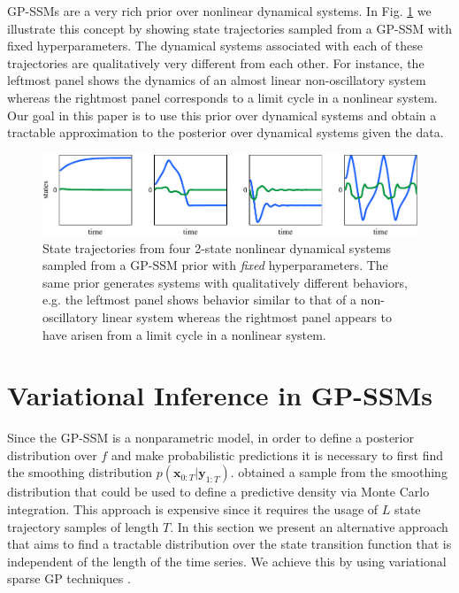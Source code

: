 \documentclass{article} %
\newcommand{\x}{\mathbf{x}}
\newcommand{\y}{\mathbf{y}}
\begin{document}
GP-SSMs are a very rich prior over nonlinear dynamical systems. In Fig. \ref{fig:samplegpssm} we illustrate this concept by showing state trajectories sampled from a GP-SSM with fixed hyperparameters. The dynamical systems associated with each of these trajectories are qualitatively very different from each other. For instance, the leftmost panel shows the dynamics of an almost linear non-oscillatory system whereas the rightmost panel corresponds to a limit cycle in a nonlinear system. Our goal in this paper is to use this prior over dynamical systems and obtain a tractable approximation to the posterior over dynamical systems given the data.


\begin{figure}[tb]
\centering
\includegraphics[width=13cm]{generative2511t.pdf}
\caption{State trajectories from  four 2-state nonlinear dynamical systems sampled from a \mbox{GP-SSM} prior with \emph{fixed} hyperparameters. The same prior generates systems with qualitatively different behaviors, e.g. the leftmost panel shows behavior similar to that of a non-oscillatory linear system whereas the rightmost panel appears to have arisen from a limit cycle in a nonlinear system.}%
\label{fig:samplegpssm}
\vspace{-0.4cm}
\end{figure}



\section{Variational Inference in GP-SSMs}
\label{sec:variational} 

Since the GP-SSM is a nonparametric model, in order to define a posterior distribution over $f$ and make probabilistic predictions it is necessary to first find the smoothing distribution $p(\x_{0:T} | \y_{1:T})$. \citet{FriLinSchRas13} obtained a sample from the smoothing distribution that could be used to define a predictive density via Monte Carlo integration. This approach is expensive since it requires the usage of $L$ state trajectory samples of length $T$. In this section we present an alternative approach that aims to find a tractable distribution over the state transition function that is independent of the length of the time series. We achieve this by using variational sparse GP techniques \citep{Titsias2009}.
\end{document}
